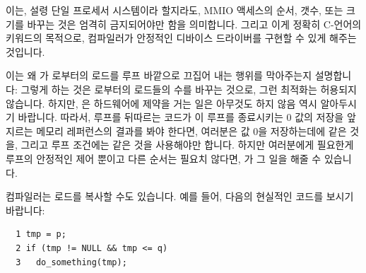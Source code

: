 이는, 설령 단일 프로세서 시스템이라 할지라도, MMIO 액세스의 순서, 갯수, 또는
크기를 바꾸는 것은 엄격히 금지되어야만 함을 의미합니다.
그리고 이게 정확히 C-언어의  키워드의 목적으로, 컴파일러가
안정적인 디바이스 드라이버를 구현할 수 있게 해주는 것입니다.

이는 왜  가  로부터의 로드를 루프 바깥으로 끄집어 내는
행위를 막아주는지 설명합니다:  그렇게 하는 것은  로부터의 
로드들의 수를 바꾸는 것으로, 그런 최적화는 허용되지 않습니다.
하지만,  은 하드웨어에 제약을 거는 일은 아무것도 하지 않음 역시
알아두시기 바랍니다.
따라서, 루프를 뒤따르는 코드가 이 루프를 종료시키는 0 값의 저장을 앞지르는
메모리 레퍼런스의 결과를 봐야 한다면, 여러분은 값 0을 저장하는데에
 같은 것을, 그리고 루프 조건에는
 같은 것을 사용해야만 합니다.
하지만 여러분에게 필요한게 루프의 안정적인 제어 뿐이고 다른 순서는 필요치
않다면,  가 그 일을 해줄 수 있습니다.

컴파일러는 로드를 복사할 수도 있습니다.
예를 들어, 다음의 현실적인 코드를 보시기 바랍니다:

\vspace{5pt}
\begin{minipage}[t]{\columnwidth}
\scriptsize
\begin{verbatim}
  1 tmp = p;
  2 if (tmp != NULL && tmp <= q)
  3   do_something(tmp);
\end{verbatim}
\end{minipage}
\vspace{5pt}

